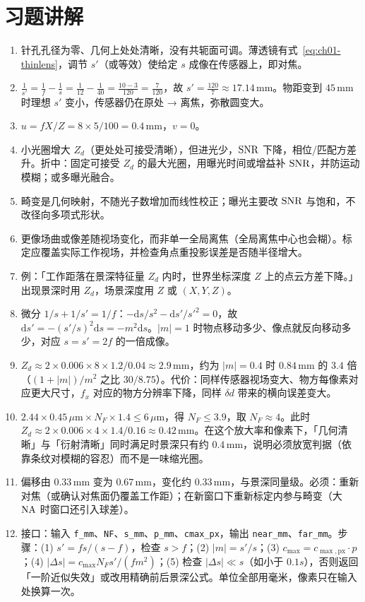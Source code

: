 \section{习题讲解}
\label{sec:ch01-solutions}

\begin{enumerate}
  \item 针孔孔径为零、几何上处处清晰，没有共轭面可调。薄透镜有式~\eqref{eq:ch01-thinlens}，调节 $s'$（或等效）使给定 $s$ 成像在传感器上，即对焦。
  \item $\frac{1}{s'}=\frac{1}{f}-\frac{1}{s}=\frac{1}{12}-\frac{1}{40}=\frac{10-3}{120}=\frac{7}{120}$，故 $s'=\frac{120}{7}\approx17.14\,\mathrm{mm}$。物距变到 $45\,\mathrm{mm}$ 时理想 $s'$ 变小，传感器仍在原处 → 离焦，弥散圆变大。
  \item $u=fX/Z=8\times5/100=0.4\,\mathrm{mm}$，$v=0$。
  \item 小光圈增大 $Z_d$（更处处可接受清晰），但进光少，$\mathrm{SNR}$ 下降，相位/匹配方差升。折中：固定可接受 $Z_d$ 的最大光圈，用曝光时间或增益补 $\mathrm{SNR}$，并防运动模糊；或多曝光融合。
  \item 畸变是几何映射，不随光子数增加而线性校正；曝光主要改 $\mathrm{SNR}$ 与饱和，不改径向多项式形状。
  \item 更像场曲或像差随视场变化，而非单一全局离焦（全局离焦中心也会糊）。标定应覆盖实际工作视场，并检查角点重投影误差是否随半径增大。
  \item 例：「工作距落在景深特征量 $Z_d$ 内时，世界坐标深度 $Z$ 上的点云方差下降。」出现景深时用 $Z_d$，场景深度用 $Z$ 或 $(X,Y,Z)$。
  \item 微分 $1/s+1/s'=1/f$：$-\mathrm{d}s/s^2-\mathrm{d}s'/s'^2=0$，故 $\mathrm{d}s'=-(s'/s)^2\mathrm{d}s=-m^2\mathrm{d}s$。$|m|=1$ 时物点移动多少、像点就反向移动多少，对应 $s=s'=2f$ 的一倍成像。
  \item $Z_d\approx2\times0.006\times8\times1.2/0.04\approx2.9\,\mathrm{mm}$，约为 $|m|=0.4$ 时 $0.84\,\mathrm{mm}$ 的 $3.4$ 倍（$(1+|m|)/m^2$ 之比 $30/8.75$）。代价：同样传感器视场变大、物方每像素对应更大尺寸，$f_x$ 对应的物方分辨率下降，同样 $\delta d$ 带来的横向误差变大。
  \item $2.44\times0.45\,\mu\mathrm{m}\times N_F\times1.4\le6\,\mu\mathrm{m}$，得 $N_F\le3.9$，取 $N_F\approx4$。此时 $Z_d\approx2\times0.006\times4\times1.4/0.16\approx0.42\,\mathrm{mm}$。在这个放大率和像素下，「几何清晰」与「衍射清晰」同时满足时景深只有约 $0.4\,\mathrm{mm}$，说明必须放宽判据（依靠条纹对模糊的容忍）而不是一味缩光圈。
  \item 偏移由 $0.33\,\mathrm{mm}$ 变为 $0.67\,\mathrm{mm}$，变化约 $0.33\,\mathrm{mm}$，与景深同量级。必须：重新对焦（或确认对焦面仍覆盖工作距）；在新窗口下重新标定内参与畸变（大 $\mathrm{NA}$ 时窗口还引入球差）。
  \item 接口：输入 \texttt{f\_mm}、\texttt{NF}、\texttt{s\_mm}、\texttt{p\_mm}、\texttt{cmax\_px}，输出 \texttt{near\_mm}、\texttt{far\_mm}。步骤：(1) $s'=fs/(s-f)$，检查 $s>f$；(2) $|m|=s'/s$；(3) $c_{\max}=c_{\max,\mathrm{px}}\cdot p$；(4) $|\Delta s|=c_{\max}N_Fs'/(fm^2)$；(5) 检查 $|\Delta s|\ll s$（如小于 $0.1s$），否则返回「一阶近似失效」或改用精确前后景深公式。单位全部用毫米，像素只在输入处换算一次。
\end{enumerate}
